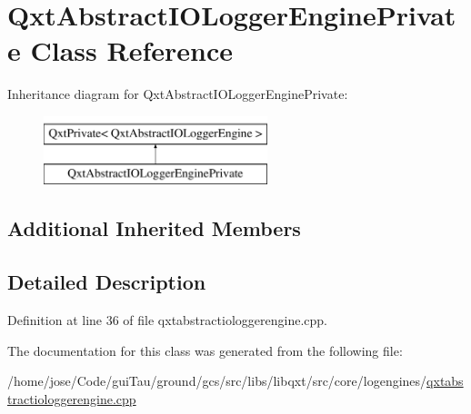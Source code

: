 \hypertarget{class_qxt_abstract_i_o_logger_engine_private}{\section{Qxt\-Abstract\-I\-O\-Logger\-Engine\-Private Class Reference}
\label{class_qxt_abstract_i_o_logger_engine_private}
}
Inheritance diagram for Qxt\-Abstract\-I\-O\-Logger\-Engine\-Private\-:\begin{figure}[H]
\begin{center}
\leavevmode
\includegraphics[height=2.000000cm]{class_qxt_abstract_i_o_logger_engine_private}
\end{center}
\end{figure}
\subsection*{Additional Inherited Members}


\subsection{Detailed Description}


Definition at line 36 of file qxtabstractiologgerengine.\-cpp.



The documentation for this class was generated from the following file\-:\begin{DoxyCompactItemize}
\item 
/home/jose/\-Code/gui\-Tau/ground/gcs/src/libs/libqxt/src/core/logengines/\hyperlink{qxtabstractiologgerengine_8cpp}{qxtabstractiologgerengine.\-cpp}\end{DoxyCompactItemize}

